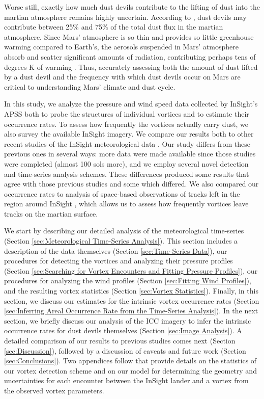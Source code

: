 \documentclass[linenumbers,trackchanges]{aastex63}
\begin{document}
Worse still, exactly how much dust devils contribute to the lifting of dust into the martian atmosphere remains highly uncertain. According to \citet{2016SSRv..203...89F}, dust devils may contribute between 25\% and 75\% of the total dust flux in the martian atmosphere. Since Mars' atmosphere is so thin and provides so little greenhouse warming compared to Earth's, the aerosols suspended in Mars' atmosphere absorb and scatter significant amounts of radiation, contributing perhaps tens of degrees K of warming \citep{2002Icar..157..259S, 2004JGRE..10911006B}. Thus, accurately assessing both the amount of dust lifted by a dust devil and the frequency with which dust devils occur on Mars are critical to understanding Mars' climate and dust cycle.

In this study, we analyze the pressure and wind speed data collected by InSight's APSS both to probe the structures of individual vortices and to estimate their occurrence rates. To assess how frequently the vortices actually carry dust, we also survey the available InSight imagery. We compare our results both to other recent studies of the InSight meteorological data \citep{2021Icar..35514119L, 2021JGRE..12606511S}. Our study differs from these previous ones in several ways: more data were made available since those studies were completed (almost 100 sols more), and we employ several novel detection and time-series analysis schemes. These differences produced some results that agree with those previous studies and some which differed. We also compared our occurrence rates to analysis of space-based observations of tracks left in the region around InSight \citep{2016Icar..266..315R, 2020GeoRL..4787234P}, which allows us to assess how frequently vortices leave tracks on the martian surface. 

We start by describing our detailed analysis of the meteorological time-series (Section \ref{sec:Meteorological Time-Series Analysis}). This section includes a description of the data themselves (Section \ref{sec:Time-Series Data}), our procedures for detecting the vortices and analyzing their pressure profiles (Section \ref{sec:Searching for Vortex Encounters and Fitting Pressure Profiles}), our procedures for analyzing the wind profiles (Section \ref{sec:Fitting Wind Profiles}), and the resulting vortex statistics (Section \ref{sec:Vortex Statistics}). Finally, in this section, we discuss our estimates for the intrinsic vortex occurrence rates (Section \ref{sec:Inferring Areal Occurrence Rate from the Time-Series Analysis}). In the next section, we briefly discuss our analysis of the ICC imagery to infer the intrinsic occurrence rates for dust devils themselves (Section \ref{sec:Image Analysis}). A detailed comparison of our results to previous studies comes next (Section \ref{sec:Discussion}), followed by a discussion of caveats and future work (Section \ref{sec:Conclusions}). Two appendices follow that provide details on the statistics of our vortex detection scheme and on our model for determining the geometry and uncertainties for each encounter between the InSight lander and a vortex from the observed vortex parameters. 
\end{document}
